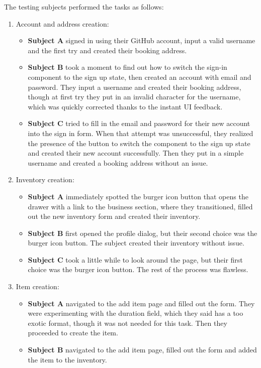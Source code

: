 The testing subjects performed the tasks as follows:
\begin{enumerate}
    \item Account and address creation:
    \begin{itemize}
        \item \textbf{Subject A} signed in using their GitHub account, input a valid username and the first try and created their booking address.
        \item \textbf{Subject B} took a moment to find out how to switch the sign-in component to the sign up state, then created an account with email and password. They input a username and created their booking address, though at first try they put in an invalid character for the username, which was quickly corrected thanks to the instant UI feedback.
        \item \textbf{Subject C} tried to fill in the email and password for their new account into the sign in form. When that attempt was unsuccessful, they realized the presence of the button to switch the component to the sign up state and created their new account successfully. Then they put in a simple username and created a booking address without an issue.
    \end{itemize}
    \item Inventory creation:
    \begin{itemize}
        \item \textbf{Subject A} immediately spotted the burger icon button that opens the drawer with a link to the business section, where they transitioned, filled out the new inventory form and created their inventory.
        \item \textbf{Subject B} first opened the profile dialog, but their second choice was the burger icon button. The subject created their inventory without issue.
        \item \textbf{Subject C} took a little while to look around the page, but their first choice was the burger icon button. The rest of the process was flawless.
    \end{itemize}
    \item Item creation:
    \begin{itemize}
        \item \textbf{Subject A} navigated to the add item page and filled out the form. They were experimenting with the duration field, which they said has a too exotic format, though it was not needed for this task. Then they proceeded to create the item.
        \item \textbf{Subject B} navigated to the add item page, filled out the form and added the item to the inventory.

\end{itemize}
\end{enumerate}
